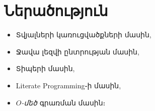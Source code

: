 \chapter{Ներածություն}

\begin{itemize}
  \item Տվյալների կառուցվածքների մասին,
  \item Ջավա լեզվի ընտրության մասին,
  \item Տիպերի մասին,
  \item Literate Programming֊ի մասին,
  \item \(O\)\textit{-մեծ} գրառման մասին։
\end{itemize}
